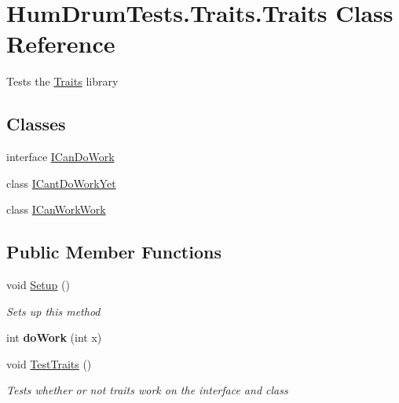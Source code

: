\hypertarget{classHumDrumTests_1_1Traits_1_1Traits}{}\section{Hum\+Drum\+Tests.\+Traits.\+Traits Class Reference}
\label{classHumDrumTests_1_1Traits_1_1Traits}


Tests the \hyperlink{classHumDrumTests_1_1Traits_1_1Traits}{Traits} library  


\subsection*{Classes}
\begin{DoxyCompactItemize}
\item 
interface \hyperlink{interfaceHumDrumTests_1_1Traits_1_1Traits_1_1ICanDoWork}{I\+Can\+Do\+Work}
\item 
class \hyperlink{classHumDrumTests_1_1Traits_1_1Traits_1_1ICantDoWorkYet}{I\+Cant\+Do\+Work\+Yet}
\item 
class \hyperlink{classHumDrumTests_1_1Traits_1_1Traits_1_1ICanWorkWork}{I\+Can\+Work\+Work}
\end{DoxyCompactItemize}
\subsection*{Public Member Functions}
\begin{DoxyCompactItemize}
\item 
void \hyperlink{classHumDrumTests_1_1Traits_1_1Traits_aa635ce010edebd450a9e0373b5e070a0}{Setup} ()
\begin{DoxyCompactList}\small\item\em Sets up this method \end{DoxyCompactList}\item 
int {\bfseries do\+Work} (int x)\hypertarget{classHumDrumTests_1_1Traits_1_1Traits_af2e499d30fa5d72b8469d1d76b4c27aa}{}\label{classHumDrumTests_1_1Traits_1_1Traits_af2e499d30fa5d72b8469d1d76b4c27aa}

\item 
void \hyperlink{classHumDrumTests_1_1Traits_1_1Traits_a19d7693f6b79d0b729260114083606ff}{Test\+Traits} ()
\begin{DoxyCompactList}\small\item\em Tests whether or not traits work on the interface and class \end{DoxyCompactList}\end{DoxyCompactItemize}


